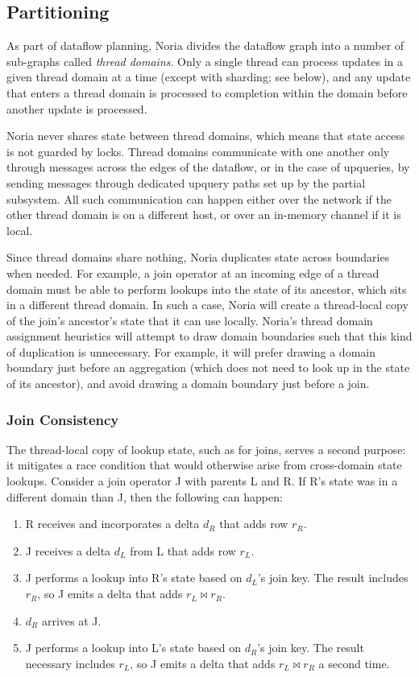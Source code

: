 \subsection{Partitioning}

As part of dataflow planning, Noria divides the dataflow graph into a number of
sub-graphs called \textit{thread domains}. Only a single thread can process
updates in a given thread domain at a time (except with sharding; see below),
and any update that enters a thread domain is processed to completion within
the domain before another update is processed.

Noria never shares state between thread domains, which means that state access
is not guarded by locks. Thread domains communicate with one another only
through messages across the edges of the dataflow, or in the case of upqueries,
by sending messages through dedicated upquery paths set up by the partial
subsystem. All such communication can happen either over the network if the
other thread domain is on a different host, or over an in-memory channel if it
is local.

Since thread domains share nothing, Noria duplicates state across boundaries
when needed. For example, a join operator at an incoming edge of a thread domain
must be able to perform lookups into the state of its ancestor, which sits in a
different thread domain. In such a case, Noria will create a thread-local copy
of the join's ancestor's state that it can use locally. Noria's thread domain
assignment heuristics will attempt to draw domain boundaries  such that this
kind of duplication is unnecessary. For example, it will prefer drawing a domain
boundary just before an aggregation (which does not need to look up in the state
of its ancestor), and avoid drawing a domain boundary just before a join.

\subsubsection{Join Consistency}
\label{s:join-state-dupe}

The thread-local copy of lookup state, such as for joins, serves a second
purpose: it mitigates a race condition that would otherwise arise from
cross-domain state lookups. Consider a join operator J with parents L and R. If
R's state was in a different domain than J, then the following can happen:

\begin{enumerate}
  \item R receives and incorporates a delta $d_R$ that adds row $r_R$.
  \item J receives a delta $d_L$ from L that adds row $r_L$.
  \item J performs a lookup into R's state based on $d_L$'s join key. The result
        includes $r_R$, so J emits a delta that adds $r_L \bowtie r_R$.
  \item $d_R$ arrives at J.
  \item J performs a lookup into L's state based on $d_R$'s join key. The result
        necessary includes $r_L$, so J emits a delta that adds $r_L \bowtie r_R$
        a second time.
\end{enumerate}

